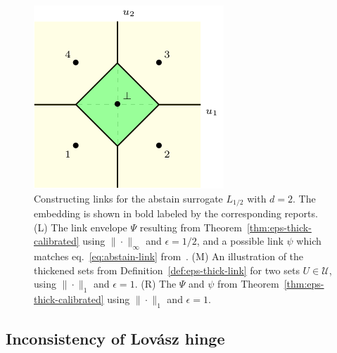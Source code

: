 \documentclass[12pt]{article}
\newcommand{\U}{\mathcal{U}}
\begin{document}
\begin{figure}
\begin{center}
\begin{minipage}{0.32\linewidth}
\end{minipage}\hfill
\begin{minipage}{0.32\linewidth}
\includegraphics[width=\linewidth]{tikz/abstain-link-l1.pdf}
\end{minipage}\hfill
\caption{Constructing links for the abstain surrogate $L_{1/2}$ with $d=2$. The embedding is shown in bold labeled by the corresponding reports. (L) The link envelope $\Psi$ resulting from Theorem~\ref{thm:eps-thick-calibrated} using $\|\cdot\|_\infty$ and $\epsilon = 1/2$, and a possible link $\psi$ which matches eq.~\eqref{eq:abstain-link} from~\cite{ramaswamy2018consistent}.  (M) An illustration of the thickened sets from Definition~\ref{def:eps-thick-link} for two sets $U \in \U$, using $\|\cdot\|_1$ and $\epsilon = 1$. (R) The $\Psi$ and $\psi$ from Theorem~\ref{thm:eps-thick-calibrated} using $\|\cdot\|_1$ and $\epsilon = 1$.}
\label{fig:abstain-links}
\end{center}
\end{figure}


\subsection{Inconsistency of Lov\'asz hinge}
\label{sec:lovasz-hinge}
\end{document}
